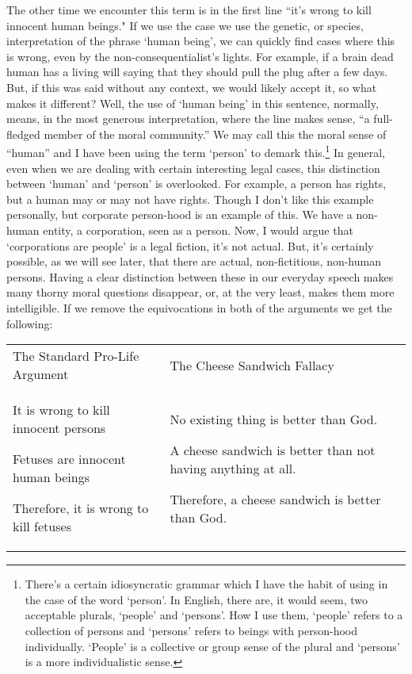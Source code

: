 The other time we encounter this term is in the first line ``it's wrong to kill innocent human beings." If we use the case we use the genetic, or species, interpretation of the phrase `human being', we can quickly find cases where this is wrong, even by the non-consequentialist's lights. For example, if a brain dead human has a living will saying that they should pull the plug after a few days. But, if this was said without any context, we would likely accept it, so what makes it different? Well, the use of `human being' in this sentence, normally, means, in the most generous interpretation, where the line makes sense,  “a full-fledged member of the moral community.” We may call this the moral sense of “human” and I have been using the term ‘person’ to demark this.\footnote{There's a certain idiosyncratic grammar which I have the habit of using in the case of the word `person'. In English, there are, it would seem, two acceptable plurals, `people' and `persons'. How I use them, `people' refers to a collection of persons and `persons' refers to beings with person-hood individually. `People' is a collective or group sense of the plural and `persons' is a more individualistic sense.} In general, even when we are dealing with certain interesting legal cases, this distinction between `human' and `person' is overlooked. For example, a person has rights, but a human may or may not have rights. Though I don't like this example personally, but corporate person-hood is an example of this. We have a non-human entity, a corporation, seen as a person. Now, I would argue that `corporations are people' is a legal fiction, it's not actual. But, it's certainly possible, as we will see later, that there are actual, non-fictitious, non-human persons. Having a clear distinction between these in our everyday speech makes many thorny moral questions disappear, or, at the very least, makes them more intelligible. If we remove the equivocations in both of the arguments we get the following:


\noindent
\begin{tabular}{p{2.75in}|p{2.75in}}
The Standard Pro-Life Argument&The Cheese Sandwich Fallacy\\
\begin{earg}
    \item[] It is wrong to kill innocent persons
    \item[] Fetuses are innocent human beings
    \item[] Therefore, it is wrong to kill fetuses
\end{earg}&
\begin{earg}
    \item[] No existing thing is better than God.
    \item[] A cheese sandwich is better than not having anything at all.
    \item[] Therefore, a cheese sandwich is better than God. 
\end{earg}
\end{tabular}

